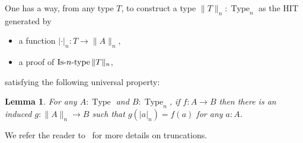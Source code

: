 \documentclass[preprint,9pt,numbers]{sigplanconf}
\newtheorem{lem}[thm]{Lemma}
\newcommand \defeq {\overset{de\hspace{-0.2ex}f}{=}}
\newcommand{\eg}{e.g,\xspace}
\DeclareMathOperator{\Type}{Type}
\DeclareMathOperator{\HProp}{HProp}
\DeclareMathOperator{\IsHProp}{IsHProp}
\DeclareMathOperator{\Contr}{Contr}
\DeclareMathOperator{\IsContr}{IsContr}
\def\mymathhyphen{{\hbox{-}}}
\newcommand{\IsType}[1]
{\mathop{\mathrm{Is\mymathhyphen}#1\mathrm{\mymathhyphen type}} }
\newcommand \squash[1] {\| #1 \| }
\begin{document}

One has a way, from any type $T$, to construct a type
$\|T\|_n:\Type_n$ as the HIT generated by
\begin{itemize}
\item a function $|\cdot|_n : T \to \|A\|_n$,
\item a proof of $\IsType n \|T\|_n$,
\end{itemize}
 satisfying the following universal property:


\begin{lem}
  For any $A:\Type$ and $B:\Type_n$, if $f:A \to B$ then there is an
  induced $g:\|A\|_n\to B$ such that $g(|a|_n)= f(a)$ for any $a:A$.
\end{lem}
%
We refer the reader to~\cite[7.3]{hottbook} for more details on 
truncations.
\end{document}
